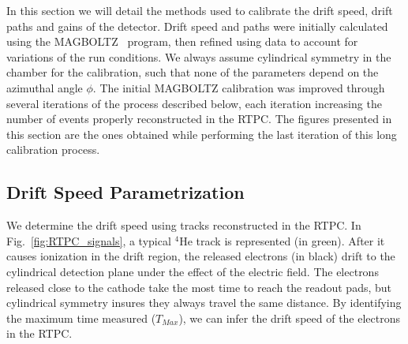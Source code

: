 \documentclass[preprint,5p]{elsarticle}
\begin{document}
In this section we will detail the methods used to calibrate the drift speed,
drift paths and gains of the detector. Drift speed and paths were initially
calculated using the MAGBOLTZ~\cite{MAGBOLTZ} program, then refined using
data to account for variations of the run conditions. We always assume 
cylindrical symmetry in the chamber for the calibration, such that none of
the parameters depend on the azimuthal angle $\phi$. The initial MAGBOLTZ
calibration was improved through several iterations of the
process described below, each iteration increasing the number of events 
properly reconstructed in the RTPC. The figures presented in this section
are the ones obtained while performing the last iteration of this long 
calibration process.


\subsection{Drift Speed Parametrization}

We determine the drift speed using tracks reconstructed in the RTPC. In 
Fig.~\ref{fig:RTPC_signals}, a typical $^{4}$He track is represented (in green). After 
it causes ionization in the drift region, the released electrons (in black) 
drift to the cylindrical detection plane under the effect of the electric field. The 
electrons released close to the cathode take the most time to reach the readout 
pads, but cylindrical symmetry insures they always travel the same 
distance. By identifying the maximum time measured ($T_{Max}$), we can infer the drift 
speed of the electrons in the RTPC.\\
\end{document}

